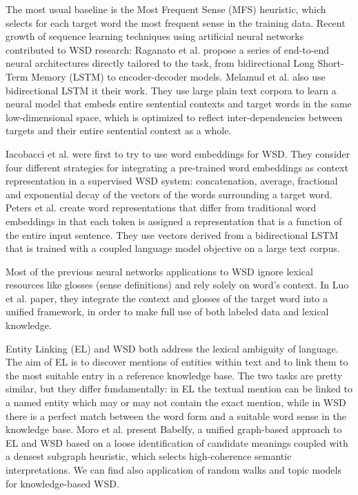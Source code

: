 \documentclass{llncs}
\begin{document}
The most usual baseline is the Most Frequent Sense\cite{evalmfs} (MFS) heuristic, which selects for each target word the most frequent sense in the training data.
Recent growth of sequence learning techniques using artificial neural networks contributed to WSD research: Raganato et al.\cite{neuralseqmodelingforWSD} propose a series of end-to-end neural architectures directly tailored to the task, from bidirectional Long Short-Term Memory (LSTM) to encoder-decoder models. Melamud et al.\cite{context2vec} also use bidirectional LSTM it their work. They use large plain text corpora to learn a neural model that embeds entire sentential contexts and target words in the same low-dimensional space, which is optimized to reflect inter-dependencies between targets and their entire sentential context as a whole.

Iacobacci et al.\cite{embeddingsforWSD} were first to try to use word embeddings for WSD. They consider four different strategies for integrating a pre-trained word embeddings as context representation in a supervised WSD system: concatenation, average, fractional and exponential decay of the vectors of the words surrounding a target word.
Peters et al.\cite{deepcontext} create word representations that differ from traditional word embeddings in that each token is assigned a representation that is a function of the entire input sentence. They use vectors derived from a bidirectional LSTM that is trained with a coupled language model objective on a large text corpus.

Most of the previous neural networks applications to WSD ignore lexical resources like glosses (sense definitions) and rely solely on word's context. In Luo et al.\cite{glosses} paper, they integrate the context and glosses of the target word into a unified framework, in order to make full use of both labeled data and lexical knowledge.

Entity Linking (EL) and WSD both address the lexical ambiguity of language. The aim of EL is to discover mentions of entities within text and to link them to the most suitable entry in a reference knowledge base. The two tasks are pretty similar, but they differ fundamentally: in EL the textual mention can be linked to a named entity which may or may not contain the exact mention, while in WSD there is a perfect match between the word form and a suitable word sense in the knowledge base.
Moro et al.\cite{babelfy} present Babelfy, a unified graph-based approach to EL and WSD based on a loose identification of candidate meanings coupled with a densest subgraph heuristic, which selects high-coherence semantic interpretations.
We can find also application of random walks\cite{randomwalks} and topic models\cite{topicmodels} for knowledge-based WSD.
\end{document}
